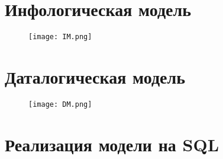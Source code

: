 \section{Инфологическая модель}
\begin{figure}[H]
    \centering
\texttt{[image: IM.png]}
\end{figure}
\newpage
\section{Даталогическая модель}
\begin{figure}[H]
    \centering
\texttt{[image: DM.png]}
\end{figure}
\section{Реализация модели на SQL}
